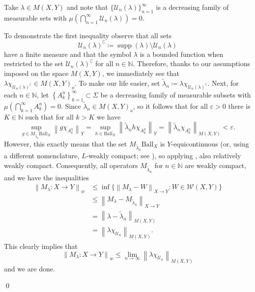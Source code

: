 \documentclass[11pt]{amsart}
\theoremstyle{definition}
\theoremstyle{definition}
\theoremstyle{definition}
\theoremstyle{definition}
\theoremstyle{definition}
\theoremstyle{definition}
\theoremstyle{definition}
\theoremstyle{definition}
\numberwithin{equation}{section}
\numberwithin{equation}{section}
\numberwithin{equation}{section}
\theoremstyle{definition}
\theoremstyle{definition}
\theoremstyle{definition}
\theoremstyle{definition}
\theoremstyle{definition}
\theoremstyle{definition}
\DeclareMathOperator{\supp}{supp}
\newcommand{\norm}[1]{\left\lVert#1\right\rVert}
\renewenvironment{proof}{\noindent {\bf Proof.}}{\qed}
\begin{document}
\begin{proof}
	Take $\lambda \in M(X,Y)$ and note that $\{\mathcal{U}_n(\lambda)\}_{n=1}^{\infty}$ is a decreasing family of measurable sets with
	$\mu\left( \bigcap_{n=1}^{\infty} \mathcal{U}_n(\lambda) \right) = 0$.
	
	To demonstrate the first inequality observe that all sets
	\begin{equation*}
		\mathcal{U}_n(\lambda)^{\complement} \coloneqq \supp(\lambda) \setminus \mathcal{U}_n(\lambda)
	\end{equation*}
	have a finite measure and that the symbol $\lambda$ is a bounded function when restricted to the set $\mathcal{U}_n(\lambda)^{\complement}$ for all $n \in \mathbb{N}$.
	Therefore, thanks to our assumptions imposed on the space $M(X,Y)$, we immediately see that $\lambda\chi_{\mathcal{U}_n(\lambda)^{\complement}} \in M(X,Y)_o$.
	To make our life easier, set $\widetilde{\lambda}_n \coloneqq \lambda\chi_{\mathcal{U}_n(\lambda)^{\complement}}$. Next, for each $n \in \mathbb{N}$, let
	$\left\{ A^n_k \right\}_{k=1}^{\infty} \subset \Sigma$ be a decreasing family of measurable subsets with $\mu\left( \bigcap_{k=1}^{\infty} A^n_k \right) = 0$.
	Since $\widetilde{\lambda}_n \in M(X,Y)_o$, so it follows that for all $\varepsilon > 0$ there is $K \in \mathbb{N}$ such that for all $k > K$ we have
	\begin{equation*}
		\sup\limits_{g \in M_{\widetilde{\lambda}_n}\text{Ball}_X} \norm{g\chi_{A^n_k}}_Y
			= \sup\limits_{h \in \text{Ball}_X} \norm{\widetilde{\lambda}_n h\chi_{A^n_k}}_Y
			= \norm{\widetilde{\lambda}_n \chi_{A^n_k}}_{M(X,Y)} < \varepsilon.
	\end{equation*}
	However, this exactly means that the set $M_{\widetilde{\lambda}_n} \text{Ball}_X$ is $Y$-equicontinuous (or, using a different nomenclature, $L$-weakly compact;
	see \cite[Definition~3.6.1, p.~212]{MN91}), so applying \cite[Proposition~3.6.5, p.~212]{MN91}, also relatively weakly compact. Consequently, all operators
	$M_{\widetilde{\lambda}_n}$ for $n \in \mathbb{N}$ are weakly compact, and we have the inequalities
	\begin{align*}
		\norm{M_{\lambda} \colon X \rightarrow Y}_{w}
			& \leqslant \inf\{\norm{M_{\lambda} - W}_{X \rightarrow Y} \colon W \in \mathscr{W}(X,Y)\} \\
			& \leqslant \norm{M_{\lambda} - M_{\widetilde{\lambda}_n}}_{X \rightarrow Y} \\
			& = \norm{\lambda - \widetilde{\lambda}_n}_{M(X,Y)} \\
			& = \norm{\lambda\chi_{\mathcal{U}_n}}_{M(X,Y)}.
	\end{align*}
	This clearly implies that
	\begin{equation*}
		\norm{M_{\lambda} \colon X \rightarrow Y}_{w} \leqslant \lim\limits_{n \rightarrow \infty} \norm{\lambda\chi_{\mathcal{U}_n}}_{M(X,Y)}
	\end{equation*}
	and we are done.
	

\end{proof}
\end{document}
